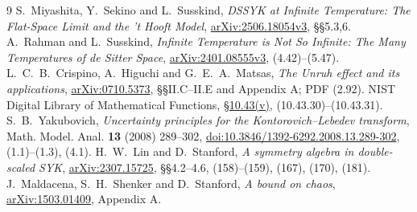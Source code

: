 \documentclass[11pt,a4paper]{article}
\begin{document}
\begin{thebibliography}{9}
\small\setlength{\itemsep}{3pt}
 S.~Miyashita, Y.~Sekino and L.~Susskind,
\emph{DSSYK at Infinite Temperature: The Flat-Space Limit and the 't Hooft Model},
\href{https://arxiv.org/abs/2506.18054}{arXiv:2506.18054v3}, \S\S5.3,6.
 A.~Rahman and L.~Susskind,
\emph{Infinite Temperature is Not So Infinite: The Many Temperatures of de Sitter Space},
\href{https://arxiv.org/abs/2401.08555}{arXiv:2401.08555v3}, (4.42)--(5.47).
 L.~C.~B.~Crispino, A.~Higuchi and G.~E.~A.~Matsas,
\emph{The Unruh effect and its applications},
\href{https://arxiv.org/abs/0710.5373}{arXiv:0710.5373},
\S\S II.C--II.E and Appendix A; PDF (2.92).
 NIST Digital Library of Mathematical Functions,
\href{https://dlmf.nist.gov/10.43.v}{\S10.43(v)}, (10.43.30)--(10.43.31).
 S.~B.~Yakubovich,
\emph{Uncertainty principles for the Kontorovich--Lebedev transform},
Math. Model. Anal. \textbf{13} (2008) 289--302,
\href{https://doi.org/10.3846/1392-6292.2008.13.289-302}{doi:10.3846/1392-6292.2008.13.289-302},
(1.1)--(1.3), (4.1).
 H.~W.~Lin and D.~Stanford,
\emph{A symmetry algebra in double-scaled SYK},
\href{https://arxiv.org/abs/2307.15725}{arXiv:2307.15725},
\S\S4.2--4.6, (158)--(159), (167), (170), (181).
 J.~Maldacena, S.~H.~Shenker and D.~Stanford,
\emph{A bound on chaos},
\href{https://arxiv.org/abs/1503.01409}{arXiv:1503.01409}, Appendix A.
\end{thebibliography}
\end{document}
